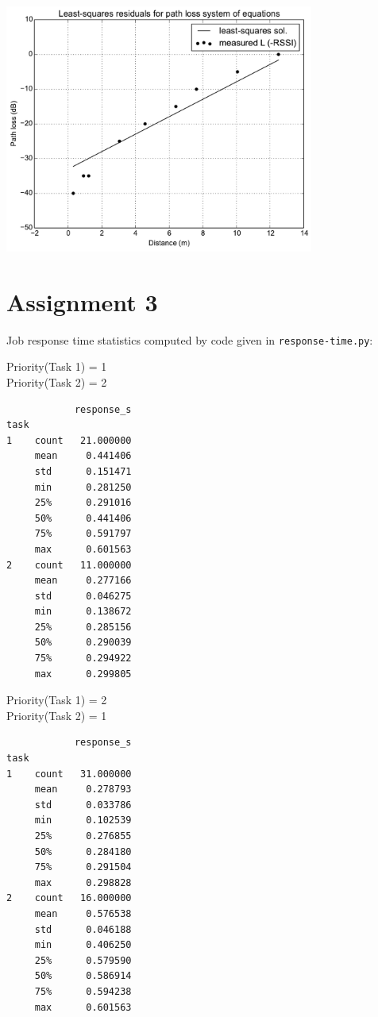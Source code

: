 \documentclass{article}
\begin{document}
\begin{center}
\includegraphics[width=4in]{path-loss-lstsq}
\end{center}

\section*{Assignment 3}

Job response time statistics computed by code given in \texttt{response-time.py}:

Priority(Task 1) = 1 \\
Priority(Task 2) = 2

\begin{verbatim}
            response_s
task
1    count   21.000000
     mean     0.441406
     std      0.151471
     min      0.281250
     25%      0.291016
     50%      0.441406
     75%      0.591797
     max      0.601563
2    count   11.000000
     mean     0.277166
     std      0.046275
     min      0.138672
     25%      0.285156
     50%      0.290039
     75%      0.294922
     max      0.299805
\end{verbatim}

Priority(Task 1) = 2 \\
Priority(Task 2) = 1

\begin{verbatim}
            response_s
task
1    count   31.000000
     mean     0.278793
     std      0.033786
     min      0.102539
     25%      0.276855
     50%      0.284180
     75%      0.291504
     max      0.298828
2    count   16.000000
     mean     0.576538
     std      0.046188
     min      0.406250
     25%      0.579590
     50%      0.586914
     75%      0.594238
     max      0.601563
\end{verbatim}
\end{document}
